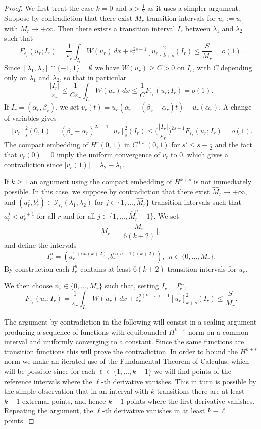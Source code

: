 \documentclass{article}
\newcommand{\e}{\varepsilon}
\begin{document}
\begin{proof} 
We first treat the case $k=0$ and $s>\frac12$ as it uses a simpler argument. 
Suppose by contradiction that there exist $M_r$ transition intervals for $u_r:=u_{\e_r}$ with $M_r\to+\infty$. Then there exists a transition interval $I_r$ between $\lambda_1$ and $\lambda_2$ such that
\begin{equation}\label{lowen2.1}
F_{\e_r}(u_r; I_r)=\frac{1}{\e_r}\int_{I_r}W(u_r)\, dx+\e_r^{2s-1}[u_r]^2_{k+s}(I_r)\leq \frac{S}{M_r}=o(1).
\end{equation}
Since $[\lambda_1,\lambda_2]\cap\{-1,1\}=\emptyset$ we have $W(u_r)\ge C>0$ on $I_r$, with $C$ depending only on $\lambda_1$ and $\lambda_2$, so that in particular
$$
\frac{|I_r|}{\e_r}\le \frac1{C\e_r}\int_{I_r} W(u_r)\,dx\le \frac1CF_{\e_r}(u_r; I_r)=o(1).
$$
If $I_r=(\alpha_r,\beta_r)$, we set $v_r(t)= u_r(\alpha_r+(\beta_r-\alpha_r)t)-u_r(\alpha_r)$. A change of variables gives
$$
[v_r]^2_s(0,1)= (\beta_r-\alpha_r)^{2s-1}[u_r]^2_s (I_r)\le \Big(\frac{|I_r|}{\e_r}\Big)^{2s-1}F_{\e_r}(u_r; I_r)=o(1).
$$
The compact embedding of $H^s(0,1)$ in $C^{0,s'}(0,1)$ for $s'\le s-\frac12$ and the fact that $v_r(0)=0$ imply the uniform convergence of $v_r$ to $0$, which gives a contradiction since $|v_r(1)|=\lambda_2-\lambda_1$.
 

\medskip
If $k\geq 1$ an argument using the compact embedding of $H^{k+s}$  is not immediately possible. 
In this case, we suppose by contradiction that there exist $\widehat M_r\to+\infty $,  and
$(a_r^j,b_r^j)\in \mathcal I_{\e_r}(\lambda_1,\lambda_2)$ for $j\in\{1,\ldots, \widehat M_r\}$ transition intervals such that $a_r^j<a_r^{j+1}$ for all $r$ and for all $j\in\{1,\dots, \widehat M_r^\eta-1\}$.  We set
$$
M_r=\bigg\lfloor \frac{\widehat M_r}{6(k+2)}\bigg\rfloor,
$$
and define the intervals 
$$I_r^{n}=(a_r^{1+6n(k+2)}, b_r^{6(n+1)(k+2)}), \ \ n\in\big\{0,\dots, M_r\big\}.$$ 
By construction each $I_r^{n}$ contains at least $6(k+2)$ transition intervals for $u_r$. 

We then choose $n_r\in \{0,\dots, M_r\}$ such that, setting $I_r=I_r^{n_r}$, 
\begin{equation}\label{lowen2}
F_{\e_r}(u_r; I_r)=\frac{1}{\e_r}\int_{I_r}W(u_r)\, dx+\e_r^{2(k+s)-1}[u_r]^2_{k+s}(I_r)\leq \frac{S}{M_r}.
\end{equation} 

The argument by contradiction in the following will consist in a scaling argument producing a sequence of functions with equibounded $H^{k+s}$ norm on a common interval and uniformly converging to a constant. Since the same functions are transition functions this will prove the contradiction. In order to bound the $H^{k+s}$ norm we make an iterated use of the Fundamental Theorem of Calculus, which will be possible since for each $\ell\in\{1,\ldots,k-1\}$ we will find points of the reference intervals where the $\ell$-th derivative vanishes. This in turn is possible by the simple observation that in an interval with $k$ transitions there are at least $k-1$ extremal points, and hence $k-1$ points where the first derivative vanishes. Repeating the argument, the $\ell$-th derivative vanishes in at least $k-\ell$ points.


\end{proof}
\end{document}
